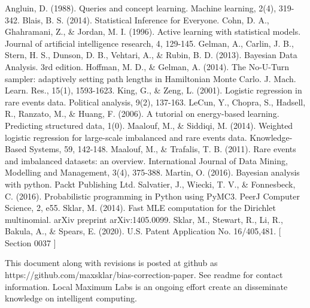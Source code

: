 \documentclass[twoside]{article}
\begin{document}
\begin{thebibliography}{20}

Angluin, D. (1988). Queries and concept learning. Machine learning, 2(4), 319-342.
Blais, B. S. (2014). Statistical Inference for Everyone.
Cohn, D. A., Ghahramani, Z., \& Jordan, M. I. (1996). Active learning with statistical models. Journal of artificial intelligence research, 4, 129-145.
Gelman, A., Carlin, J. B., Stern, H. S., Dunson, D. B., Vehtari, A., \& Rubin, B. D. (2013). Bayesian Data Analysis. 3rd edition.
Hoffman, M. D., \& Gelman, A. (2014). The No-U-Turn sampler: adaptively setting path lengths in Hamiltonian Monte Carlo. J. Mach. Learn. Res., 15(1), 1593-1623.
King, G., \& Zeng, L. (2001). Logistic regression in rare events data. Political analysis, 9(2), 137-163.
LeCun, Y., Chopra, S., Hadsell, R., Ranzato, M., \& Huang, F. (2006). A tutorial on energy-based learning. Predicting structured data, 1(0).
Maalouf, M., \& Siddiqi, M. (2014). Weighted logistic regression for large-scale imbalanced and rare events data. Knowledge-Based Systems, 59, 142-148.
Maalouf, M., \& Trafalis, T. B. (2011). Rare events and imbalanced datasets: an overview. International Journal of Data Mining, Modelling and Management, 3(4), 375-388.
Martin, O. (2016). Bayesian analysis with python. Packt Publishing Ltd.
Salvatier, J., Wiecki, T. V., \& Fonnesbeck, C. (2016). Probabilistic programming in Python using PyMC3. PeerJ Computer Science, 2, e55.
Sklar, M. (2014). Fast MLE computation for the Dirichlet multinomial. arXiv preprint arXiv:1405.0099.
Sklar, M., Stewart, R., Li, R., Bakula, A., \& Spears, E. (2020). U.S. Patent Application No. 16/405,481. [ Section 0037 ]

\end{thebibliography}

This document along with revisions is posted at github as https://github.com/maxsklar/bias-correction-paper. See readme for contact information. Local Maximum Labs is an ongoing effort create an disseminate knowledge on intelligent computing.
\end{document}

